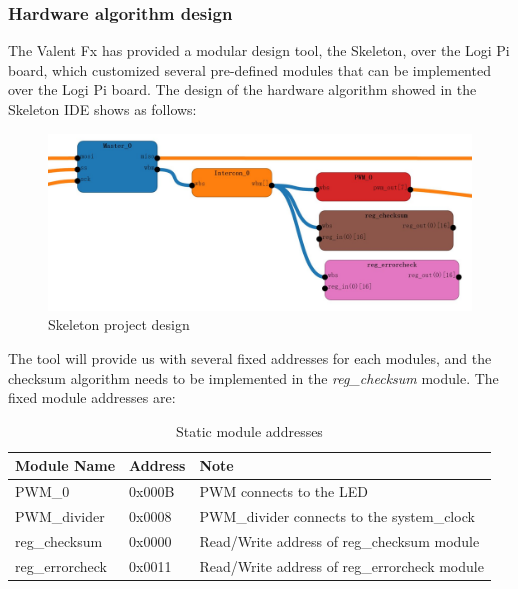 \documentclass[11pt,openright,a4paper]{report}
\begin{document}
\subsubsection{Hardware algorithm design}
The Valent Fx has provided a modular design tool, the Skeleton, over the Logi Pi board, which customized several pre-defined modules that can be implemented over the Logi Pi board\cite{skeleton}.
The design of the hardware algorithm showed in the Skeleton IDE shows as follows:
\begin{figure}[H]
\centering
\includegraphics[width=0.9\linewidth]{picture/skeletonProj}
\caption{Skeleton project design}
\label{fig:skeletonProj}
\end{figure}
The tool will provide us with several fixed addresses for each modules, and the checksum algorithm needs to be implemented in the \textit{reg\_checksum} module. The fixed module addresses are:
\begin{table}[H]
	\centering
	\caption{Static module addresses}
	\label{my-label}
	\begin{tabular}{@{}lll@{}}
		\toprule
		Module Name   & Address & Note                                       \\ \midrule
		PWM\_0        & 0x000B  & PWM connects to the LED                    \\
		PWM\_divider  & 0x0008  & PWM\_divider connects to the system\_clock \\
		reg\_checksum & 0x0000  & Read/Write address of reg\_checksum module \\
		reg\_errorcheck & 0x0011 & Read/Write address of reg\_errorcheck module \\
		 \bottomrule
	\end{tabular}
\end{table}
\end{document}
